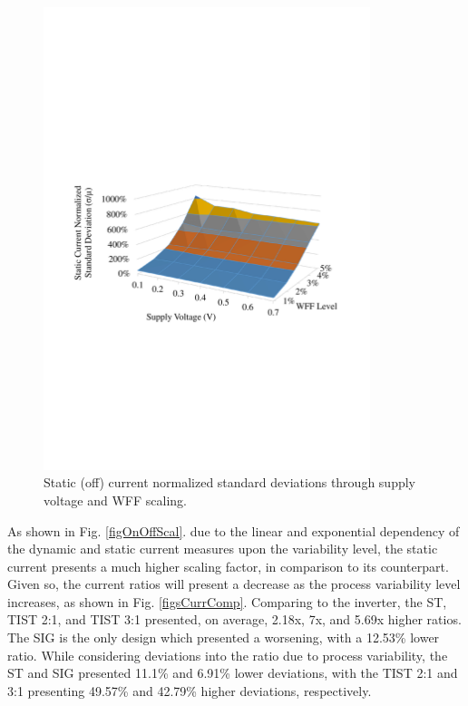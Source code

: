 \documentclass[diss,pgmicro,english]{iiufrgs}
\begin{document}
    \begin{figure}[H]
        \centering
            \includegraphics[width=0.85\textwidth, trim={1.25cm 9cm 2cm 11cm}, clip]{staticCurrDev.pdf}
            \caption{Static (off) current normalized standard deviations through supply voltage and WFF scaling.}
        \label{fig:StatCurrDev}
    \end{figure}

As shown in Fig. \ref{figOnOffScal}. due to the linear and exponential dependency of the dynamic and static current measures upon the variability level, the static current presents a much higher scaling factor, in comparison to its counterpart. Given so, the current ratios will present a decrease as the process variability level increases, as shown in Fig. \ref{figsCurrComp}. Comparing to the inverter, the ST, TIST 2:1, and TIST 3:1 presented, on average, 2.18x, 7x, and 5.69x higher ratios. The SIG is the only design which presented a worsening, with a 12.53\% lower ratio. While considering deviations into the ratio due to process variability, the ST and SIG presented 11.1\% and 6.91\% lower deviations, with the TIST 2:1 and 3:1 presenting 49.57\% and 42.79\% higher deviations, respectively.
\end{document}
